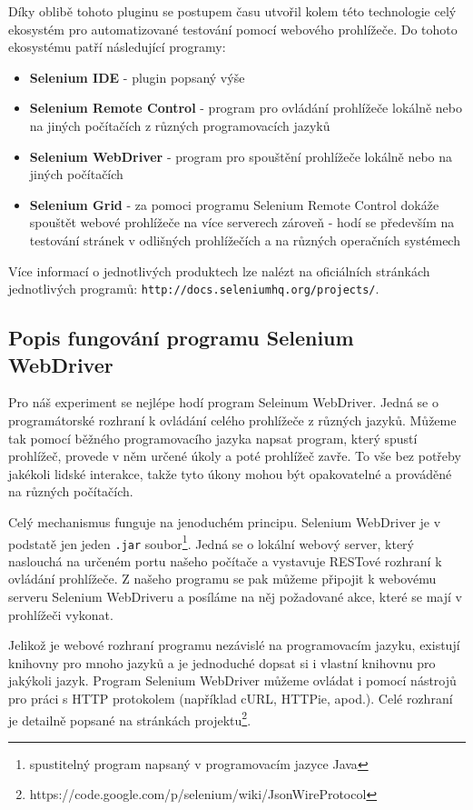 \documentclass[thesis=M,czech]{FITthesis}[2013/05/10]
\begin{document}
Díky oblibě tohoto pluginu se postupem času utvořil kolem této technologie celý ekosystém pro automatizované testování pomocí webového prohlížeče. Do tohoto ekosystému patří následující programy:

\begin{itemize}
  \item \textbf{Selenium IDE} - plugin popsaný výše
  \item \textbf{Selenium Remote Control} - program pro ovládání prohlížeče lokálně nebo na jiných počítačích z různých programovacích jazyků
  \item \textbf{Selenium WebDriver} - program pro spouštění prohlížeče lokálně nebo na jiných počítačích
  \item \textbf{Selenium Grid} - za pomoci programu Selenium Remote Control dokáže spouštět webové prohlížeče na více serverech zároveň - hodí se především na testování stránek v odlišných prohlížečích a na různých operačních systémech
\end{itemize}

Více informací o jednotlivých produktech lze nalézt na oficiálních stránkách jednotlivých programů: \verb|http://docs.seleniumhq.org/projects/|. 

\subsection{Popis fungování programu Selenium WebDriver}

Pro náš experiment se nejlépe hodí program Seleinum WebDriver. Jedná se o programátorské rozhraní k ovládání celého prohlížeče z různých jazyků. Můžeme tak pomocí běžného programovacího jazyka napsat program, který spustí prohlížeč, provede v něm určené úkoly a poté prohlížeč zavře. To vše bez potřeby jakékoli lidské interakce, takže tyto úkony mohou být opakovatelné a prováděné na různých počítačích.

Celý mechanismus funguje na jenoduchém principu. Selenium WebDriver je v podstatě jen jeden \verb|.jar| soubor\footnote{spustitelný program napsaný v programovacím jazyce Java}. Jedná se o lokální webový server, který naslouchá na určeném portu našeho počítače a vystavuje RESTové rozhraní k ovládání prohlížeče. Z našeho programu se pak můžeme připojit k webovému serveru Selenium WebDriveru a posíláme na něj požadované akce, které se mají v prohlížeči vykonat. 

Jelikož je webové rozhraní programu nezávislé na programovacím jazyku, existují knihovny pro mnoho jazyků a je jednoduché dopsat si i vlastní knihovnu pro jakýkoli jazyk. Program Selenium WebDriver můžeme ovládat i pomocí nástrojů pro práci s HTTP protokolem (například cURL, HTTPie, apod.). Celé rozhraní je detailně popsané na stránkách projektu\footnote{https://code.google.com/p/selenium/wiki/JsonWireProtocol}.
\end{document}
